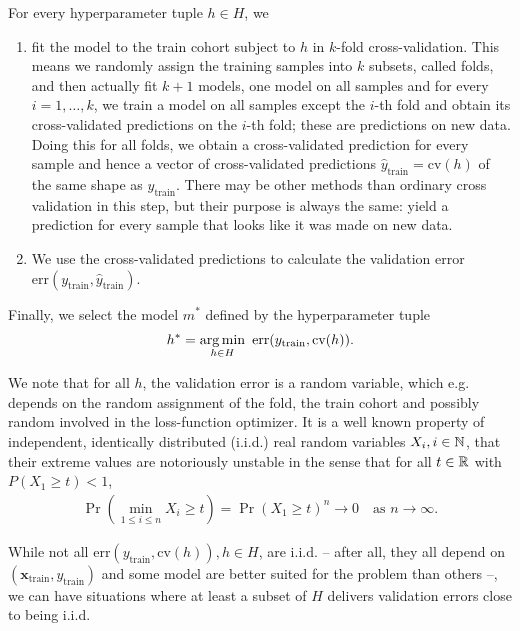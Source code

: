 For every hyperparameter tuple $h \in H$, we
\begin{enumerate}
    \item fit the model to the train cohort subject to $h$ in $k$-fold cross-validation. This means 
        we randomly assign the training samples into $k$ subsets, called folds, and then actually 
        fit $k+1$ models, one model on all samples and for every $i = 1, \ldots, k$, we train a model
        on all samples except the $i$-th fold and obtain its cross-validated predictions on the 
        $i$-th fold; these are predictions on new data. Doing this for all folds, we obtain a 
        cross-validated prediction for every sample and hence a vector of cross-validated predictions
        $\hat{y}_\text{train} = \text{cv}(h)$ of the same shape as $y_\text{train}$. There may be 
        other methods than ordinary cross
        validation in this step, but their purpose is always the same: yield a prediction for every 
        sample that looks like it was made on new data.
    \item We use the cross-validated predictions to calculate the validation error 
        $\text{err}(y_\text{train}, \hat{y}_\text{train})$.
\end{enumerate}

Finally, we select the model $m^*$ defined by the hyperparameter tuple 
\begin{align}
    h^* = \operatorname*{arg\,min}_{h \in H} \ \text{err}(y_\text{train}, \text{cv}(h)).
\end{align}

We note that for all $h$, the validation error is a random variable, which e.g. depends on the 
random assignment of the fold, the train cohort and possibly random involved in the loss-function
optimizer. It is a well known property of independent,
identically distributed (i.i.d.) real random variables $X_i, i \in \mathbb{N}$, that their extreme values 
are notoriously unstable in the sense that for all $t \in \mathbb{R}$ with $P(X_1 \geq t) < 1$, 
\begin{align}
    \Pr\left( \min_{1 \leq i \leq n} X_i \geq t \right) = \Pr(X_1 \geq t)^n \to 0 \quad
    \text{as } n \to \infty.
\end{align}

While not all $\text{err}(y_\text{train}, \text{cv}(h)), h \in H$, are i.i.d. -- after all, they 
all depend on 
$(\mathbf{x}_\text{train}, y_\text{train})$ and some model are better suited for the problem than others --,
we can have situations where at least a subset of $H$ delivers validation errors close to being i.i.d.

